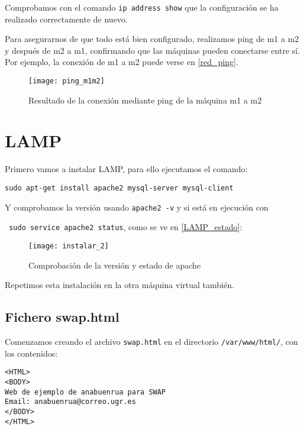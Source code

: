 Comprobamos con el comando \verb|ip address show| que la configuración se ha realizado correctamente de nuevo.

Para asegurarnos de que todo está bien configurado, realizamos ping de m1 a m2 y después de m2 a m1, confirmando que las máquinas pueden conectarse entre sí. Por ejemplo, la conexión de m1 a m2 puede verse en \eqref{red_ping}.

\begin{figure}[h!]
\begin{center}
\caption{Resultado de la conexión mediante ping de la máquina m1 a m2}
\label{red_ping}
\texttt{[image: ping\_m1m2]}
\end{center}
\end{figure}

\chapter{LAMP}

Primero vamos a instalar LAMP, para ello ejecutamos el comando:

\begin{verbatim}
sudo apt-get install apache2 mysql-server mysql-client
\end{verbatim}

Y comprobamos la versión usando \verb|apache2 -v| y si está en ejecución con 

\verb| sudo service apache2 status|, como se ve en \eqref{LAMP_estado}:

\begin{figure}[h!]
\begin{center}
\caption{Comprobación de la versión y estado de apache}
\label{LAMP_estado}
\texttt{[image: instalar\_2]}
\end{center}
\end{figure}

Repetimos esta instalación en la otra máquina virtual también.

\section{Fichero swap.html}

Comenzamos creando el archivo \verb|swap.html| en el directorio \verb|/var/www/html/|, con los contenidos:

\begin{verbatim}
<HTML>
<BODY>
Web de ejemplo de anabuenrua para SWAP
Email: anabuenrua@correo.ugr.es
</BODY>
</HTML>
\end{verbatim}

